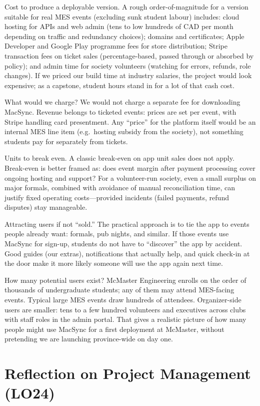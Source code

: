 \documentclass{article}
\begin{document}
Cost to produce a deployable version. A rough order-of-magnitude
for a version suitable for real MES events (excluding sunk student labour)
includes: cloud hosting for APIs and web admin (tens to low hundreds
of CAD per month depending on traffic and redundancy choices); domains
and certificates; Apple Developer and Google Play programme
fees for store distribution; Stripe transaction fees on ticket sales
(percentage-based, passed through or absorbed by policy); and admin
time for society volunteers (watching for errors, refunds, role changes). If we
priced our build time at industry salaries, the project would look expensive; as
a capstone, student hours stand in for a lot of that cash cost.

What would we charge? We would not charge a separate fee for
downloading MacSync. Revenue belongs to ticketed events: prices are set
per event, with Stripe handling card presentment. Any ``price'' for the platform
itself would be an internal MES line item (e.g.\ hosting subsidy from the
society), not something students pay for separately from tickets.

Units to break even. A classic break-even on app unit sales does
not apply. Break-even is better framed as: does event margin after
payment processing cover ongoing hosting and support? For a volunteer-run
society, even a small surplus on major formals, combined with avoidance of
manual reconciliation time, can justify fixed operating costs---provided incidents
(failed payments, refund disputes) stay manageable.

Attracting users if not ``sold.'' The practical approach is to tie the app
to events people already want: formals, pub nights, and similar. If those
events use MacSync for sign-up, students do not have to ``discover'' the app by
accident. Good guides (our extras), notifications that actually help, and quick
check-in at the door make it more likely someone will use the app again next time.

How many potential users exist? McMaster Engineering enrolls on
the order of thousands of undergraduate students; any of them may
attend MES-facing events. Typical large MES events draw hundreds of
attendees. Organizer-side users are smaller: tens to a few hundred volunteers and
executives across clubs with staff roles in the admin portal. That gives a
realistic picture of how many people might use MacSync for a first
deployment at McMaster, without pretending we are launching province-wide on day
one.

\section{Reflection on Project Management (LO24)}
\end{document}
